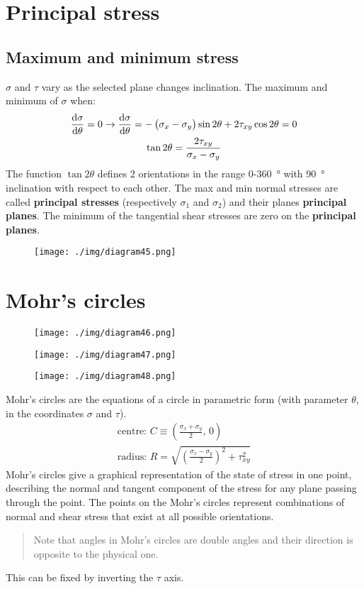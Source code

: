 \section{Principal stress}
\subsection{Maximum and minimum stress}
$\sigma$ and $\tau$ vary as the selected plane changes inclination. The maximum and minimum of $\sigma$ when:
\begin{gather}
  \frac{\dif \sigma}{\dif \theta} = 0 \rightarrow \frac{\dif \sigma}{\dif \theta} = - \left(\sigma_x - \sigma_y\right)\sin 2\theta + 2\tau_{xy}\cos 2\theta = 0\\
  \tan 2\theta = \frac{2\tau_{xy}}{\sigma_x - \sigma_y}
\end{gather}
The function $\tan 2\theta$ defines 2 orientations in the range 0-\SI{360}{\degree} with \SI{90}{\degree} inclination with respect to each other. The max and min normal stresses are called \textbf{principal stresses} (respectively $\sigma_1$ and $\sigma_2$) and their planes \textbf{principal planes}. The minimum of the tangential shear stresses are zero on the \textbf{principal planes}.
\begin{figure}[H]
  \centering
  \texttt{[image: ./img/diagram45.png]}
  \caption{}
\end{figure}
\section{Mohr's circles}
\begin{figure}[H]
  \centering
  \texttt{[image: ./img/diagram46.png]}
  \caption{}
\end{figure}
\begin{figure}[H]
  \centering
  \texttt{[image: ./img/diagram47.png]}
  \caption{}
\end{figure}
\begin{figure}[H]
  \centering
  \texttt{[image: ./img/diagram48.png]}
  \caption{}
\end{figure}
Mohr's circles are the equations of a circle in parametric form (with parameter $\theta$, in the coordinates $\sigma$ and $\tau$).
\begin{gather}
  \textrm{centre: } C \equiv \left(\frac{\sigma_x + \sigma_y}{2}, \, 0\right)\\
  \textrm{radius: } R = \sqrt{\left(\frac{\sigma_x - \sigma_y}{2}\right)^2 + \tau^2_{xy}}
\end{gather}
Mohr's circles give a graphical representation of the state of stress in one point, describing the normal and tangent component of the stress for any plane passing through the point. The points on the Mohr's circles represent combinations of normal and shear stress that exist at all possible orientations.
\begin{quotation}
  Note that angles in Mohr's circles are double angles and their direction is opposite to the physical one.
\end{quotation}
This can be fixed by inverting the $\tau$ axis.
